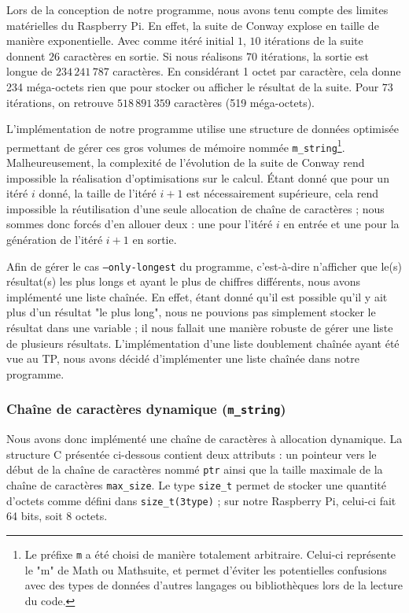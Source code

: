 \documentclass[a4paper,11pt]{article}
\begin{document}
Lors de la conception de notre programme, nous avons tenu compte des limites matérielles du Raspberry Pi. En effet, la suite de Conway explose en taille de manière exponentielle. Avec comme itéré initial $1$, $10$ itérations de la suite donnent $26$ caractères en sortie. Si nous réalisons $70$ itérations, la sortie est longue de $234\,241\,787$ caractères. En considérant 1 octet par caractère, cela donne 234 méga-octets rien que pour stocker ou afficher le résultat de la suite. Pour $73$ itérations, on retrouve $518\,891\,359$ caractères (519 méga-octets).

L'implémentation de notre programme utilise une structure de données optimisée permettant de gérer ces gros volumes de mémoire nommée \texttt{m\_string}\footnote{Le préfixe \texttt{m} a été choisi de manière totalement arbitraire. Celui-ci représente le "m" de Math ou Mathsuite, et permet d'éviter les potentielles confusions avec des types de données d'autres langages ou bibliothèques lors de la lecture du code.}. Malheureusement, la complexité de l'évolution de la suite de Conway rend impossible la réalisation d'optimisations sur le calcul. Étant donné que pour un itéré $i$ donné, la taille de l'itéré $i+1$ est nécessairement supérieure, cela rend impossible la réutilisation d'une seule allocation de chaîne de caractères ; nous sommes donc forcés d'en allouer deux : une pour l'itéré $i$ en entrée et une pour la génération de l'itéré $i+1$ en sortie.

Afin de gérer le cas \texttt{--only-longest} du programme, c'est-à-dire n'afficher que le(s) résultat(s) les plus longs et ayant le plus de chiffres différents, nous avons implémenté une liste chaînée. En effet, étant donné qu'il est possible qu'il y ait plus d'un résultat "le plus long", nous ne pouvions pas simplement stocker le résultat dans une variable ; il nous fallait une manière robuste de gérer une liste de plusieurs résultats. L'implémentation d'une liste doublement chaînée ayant été vue au TP, nous avons décidé d'implémenter une liste chaînée dans notre programme.

\subsubsection{Chaîne de caractères dynamique (\texttt{m\_string})}
\label{m_string}

Nous avons donc implémenté une chaîne de caractères à allocation dynamique. La structure C présentée ci-dessous contient deux attributs : un pointeur vers le début de la chaîne de caractères nommé \texttt{ptr} ainsi que la taille maximale de la chaîne de caractères \texttt{max\_size}. Le type \texttt{size\_t} permet de stocker une quantité d'octets comme défini dans \texttt{size\_t(3type)} ; sur notre Raspberry Pi, celui-ci fait 64 bits, soit 8 octets.
\end{document}
